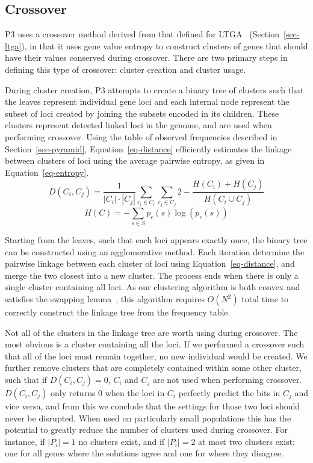 \documentclass{sig-alternate}
\begin{document}
\subsection{Crossover}
\label{sec-crossover}
P3 uses a crossover method derived from that defined for LTGA~\cite{thierens:2013:ltgahiff}
(Section~\ref{sec-ltga}),
in that it uses gene value entropy to construct clusters of genes that should have their values
conserved during crossover.  There are two primary steps in
defining this type of crossover: cluster creation and cluster usage.

During cluster creation, P3 attempts to create a binary tree of clusters such that the leaves
represent individual gene loci and each internal node represent the subset of loci created
by joining the subsets encoded in its children.  These clusters represent detected linked
loci in the genome, and are used when performing crossover.
Using the table of observed frequencies described in Section~\ref{sec-pyramid}, Equation~\ref{eq-distance}
efficiently estimates the linkage between clusters of loci using the average pairwise
entropy, as given in Equation~\ref{eq-entropy}.
\begin{equation}
  D(C_i,C_j) = \frac{1}{\left | C_i \right |\cdot \left |C_j \right|}\sum_{c_i \in C_i}\sum_{c_j \in C_j} 
  2 - \frac{H(C_i) + H(C_j)}{H(C_i \cup C_j)}
  \label{eq-distance}
\end{equation}
\begin{equation}
  H(C) = -\sum_{s\in S} p_c(s)\log(p_c(s))
  \label{eq-entropy}
\end{equation}

Starting from the leaves, such that each loci appears exactly once, the binary tree
can be constructed using an agglomerative method.  Each iteration determine the
pairwise linkage between each cluster of loci using Equation~\ref{eq-distance},
and merge the two closest into a new cluster.  The process ends when there is only
a single cluster containing all loci.  As our clustering algorithm is both convex and
satisfies the swapping lemma~\cite{gronau:2007:upgma},
this algorithm requires $O(N^2)$ total time to correctly construct the linkage tree
from the frequency table.

Not all of the clusters in the linkage tree are worth using during crossover.  The most
obvious is a cluster containing all the loci.  If we performed a crossover such that all
of the loci must remain together, no new individual would be created.  We further remove
clusters that are completely contained within some other cluster, such that if
$D(C_i,C_j) = 0$, $C_i$ and $C_j$ are not used when performing crossover.  $D(C_i,C_j)$ only
returns $0$ when the loci in $C_i$ perfectly predict the bits in $C_j$ and vice versa,
and from this we conclude that the settings for those two loci should never be disrupted.
When used on particularly small populations this has the potential to greatly reduce the number
of clusters used during crossover.  For instance, if $|P_i| = 1$ no clusters exist, and if $|P_i| = 2$
at most two clusters exist: one for all genes where the solutions agree and one for where they disagree.
\end{document}
